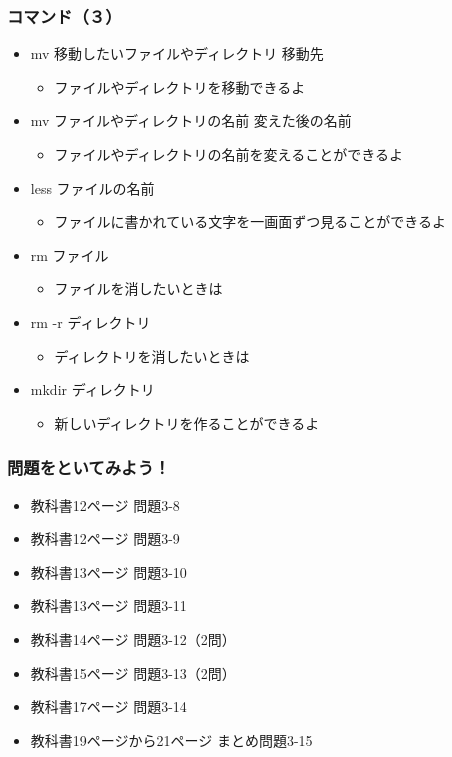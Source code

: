 \begin{frame}
    \frametitle{コマンド（３）}
    \begin{itemize}
        \item mv 移動したいファイルやディレクトリ 移動先
        \begin{itemize}
            \item ファイルやディレクトリを移動できるよ
        \end{itemize}
        \item mv ファイルやディレクトリの名前 変えた後の名前
        \begin{itemize}
            \item ファイルやディレクトリの名前を変えることができるよ
        \end{itemize}
        \item less ファイルの名前
        \begin{itemize}
            \item ファイルに書かれている文字を一画面ずつ見ることができるよ
        \end{itemize}
        \item rm ファイル
        \begin{itemize}
            \item ファイルを消したいときは
        \end{itemize}
        \item rm -r ディレクトリ
        \begin{itemize}
            \item ディレクトリを消したいときは
        \end{itemize}
        \item mkdir ディレクトリ
        \begin{itemize}
            \item 新しいディレクトリを作ることができるよ
        \end{itemize}
    \end{itemize}
\end{frame}

\begin{frame}
    \frametitle{問題をといてみよう！}
    \begin{itemize}
        \item 教科書12ページ 問題3-8
        \item 教科書12ページ 問題3-9
        \item 教科書13ページ 問題3-10
        \item 教科書13ページ 問題3-11
        \item 教科書14ページ 問題3-12（2問）
        \item 教科書15ページ 問題3-13（2問）
        \item 教科書17ページ 問題3-14
        \item 教科書19ページから21ページ まとめ問題3-15
    \end{itemize}
\end{frame}
